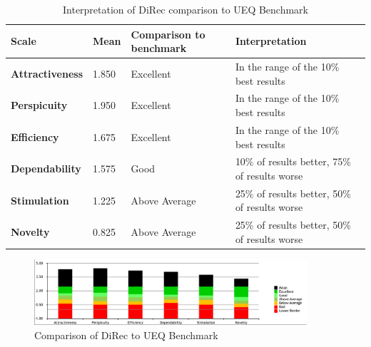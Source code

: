 \begin{table}[!htbp]
\tiny
\centering
\begin{tabular}{|l|l|l|l|}
\hline
\textbf{Scale}          & \textbf{Mean} & \textbf{Comparison to benchmark} & \textbf{Interpretation}                       \\ \hline
\textbf{Attractiveness} & 1.850         & Excellent                         & In the range of the 10\% best results         \\ \hline
\textbf{Perspicuity}    & 1.950         & Excellent                         & In the range of the 10\% best results         \\ \hline
\textbf{Efficiency}     & 1.675         & Excellent                         & In the range of the 10\% best results         \\ \hline
\textbf{Dependability}  & 1.575         & Good                              & 10\% of results better, 75\% of results worse \\ \hline
\textbf{Stimulation}    & 1.225         & Above Average                     & 25\% of results better, 50\% of results worse \\ \hline
\textbf{Novelty}        & 0.825         & Above Average                     & 25\% of results better, 50\% of results worse \\ \hline
\end{tabular}
\caption{Interpretation of DiRec comparison to UEQ Benchmark}
\label{table:table56}
\end{table}
\begin{figure}[!htbp]
\centering
\includegraphics[width=0.9\textwidth]{figures/direc-benchmark}
\caption{Comparison of DiRec to UEQ Benchmark}
\label{fig:figure511}
\end{figure} 
